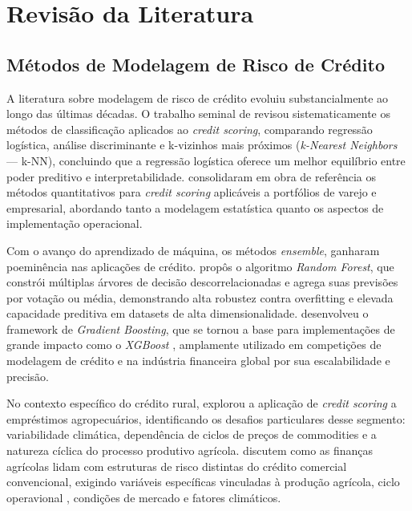 \chapter{Revisão da Literatura} \label{sec:revisao}

\section{Métodos de Modelagem de Risco de Crédito}

A literatura sobre modelagem de risco de crédito evoluiu substancialmente ao longo das últimas décadas. O trabalho seminal de \cite{hand&henley1997} revisou sistematicamente os métodos de classificação aplicados ao \textit{credit scoring}, comparando regressão logística, análise discriminante e k-vizinhos mais próximos (\textit{k-Nearest Neighbors} — k-NN), concluindo que a regressão logística oferece um melhor equilíbrio entre poder preditivo e interpretabilidade. \cite{thomasetal2002} consolidaram em obra de referência os métodos quantitativos para \textit{credit scoring} aplicáveis a portfólios de varejo e empresarial, abordando tanto a modelagem estatística quanto os aspectos de implementação operacional.

Com o avanço do aprendizado de máquina, os métodos \textit{ensemble}, ganharam poeminência nas aplicações de crédito. \cite{breiman2001} propôs o algoritmo \textit{Random Forest}, que constrói múltiplas árvores de decisão descorrelacionadas e agrega suas previsões por votação ou média, demonstrando alta robustez contra overfitting e elevada capacidade preditiva em datasets de alta dimensionalidade. \cite{friedman2001} desenvolveu o framework de \textit{Gradient Boosting}, que se tornou a base para implementações de grande impacto como o \textit{XGBoost} \cite{chen&guestrin2016}, amplamente utilizado em competições de modelagem de crédito e na indústria financeira global por sua escalabilidade e precisão.

No contexto específico do crédito rural, \cite{turvey1991} explorou a aplicação de \textit{credit scoring} a empréstimos agropecuários, identificando os desafios particulares desse segmento: variabilidade climática, dependência de ciclos de preços de commodities e a natureza cíclica do processo produtivo agrícola. \cite{barry&ellinger2011} discutem como as finanças agrícolas lidam com estruturas de risco distintas do crédito comercial convencional, exigindo variáveis específicas vinculadas à produção agrícola, ciclo operavional , condições de mercado e fatores climáticos.

